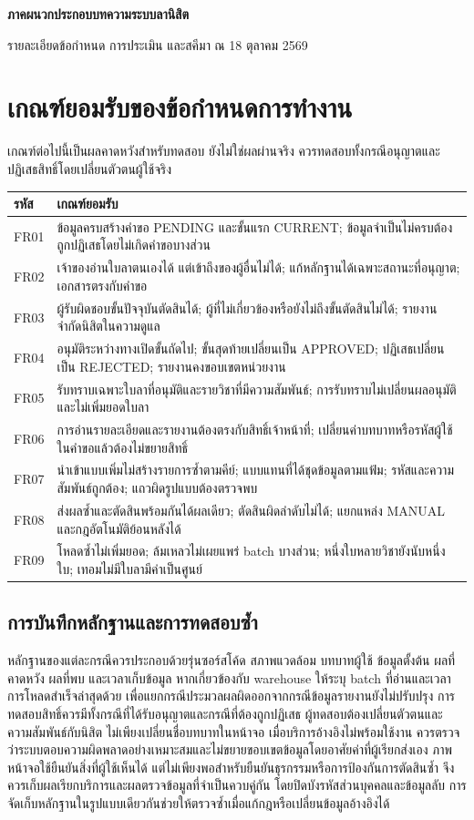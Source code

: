 \begin{center}\textbf{ภาคผนวกประกอบบทความระบบลานิสิต}\end{center}
รายละเอียดข้อกำหนด การประเมิน และสคีมา ณ 18 ตุลาคม 2569
\appendix
\section{เกณฑ์ยอมรับของข้อกำหนดการทำงาน}
เกณฑ์ต่อไปนี้เป็นผลคาดหวังสำหรับทดสอบ ยังไม่ใช่ผลผ่านจริง ควรทดสอบทั้งกรณีอนุญาตและปฏิเสธสิทธิ์โดยเปลี่ยนตัวตนผู้ใช้จริง
\begin{tabularx}{\textwidth}{|p{16mm}|X|}
\hline
รหัส & เกณฑ์ยอมรับ \\ \hline
FR01 & ข้อมูลครบสร้างคำขอ PENDING และขั้นแรก CURRENT; ข้อมูลจำเป็นไม่ครบต้องถูกปฏิเสธโดยไม่เกิดคำขอบางส่วน \\ \hline
FR02 & เจ้าของอ่านใบลาตนเองได้ แต่เข้าถึงของผู้อื่นไม่ได้; แก้หลักฐานได้เฉพาะสถานะที่อนุญาต; เอกสารตรงกับคำขอ \\ \hline
FR03 & ผู้รับผิดชอบขั้นปัจจุบันตัดสินได้; ผู้ที่ไม่เกี่ยวข้องหรือยังไม่ถึงขั้นตัดสินไม่ได้; รายงานจำกัดนิสิตในความดูแล \\ \hline
FR04 & อนุมัติระหว่างทางเปิดขั้นถัดไป; ขั้นสุดท้ายเปลี่ยนเป็น APPROVED; ปฏิเสธเปลี่ยนเป็น REJECTED; รายงานคงขอบเขตหน่วยงาน \\ \hline
FR05 & รับทราบเฉพาะใบลาที่อนุมัติและรายวิชาที่มีความสัมพันธ์; การรับทราบไม่เปลี่ยนผลอนุมัติและไม่เพิ่มยอดใบลา \\ \hline
FR06 & การอ่านรายละเอียดและรายงานต้องตรงกับสิทธิ์เจ้าหน้าที่; เปลี่ยนค่าบทบาทหรือรหัสผู้ใช้ในคำขอแล้วต้องไม่ขยายสิทธิ์ \\ \hline
FR07 & นำเข้าแบบเพิ่มไม่สร้างรายการซ้ำตามคีย์; แบบแทนที่ได้ชุดข้อมูลตามแฟ้ม; รหัสและความสัมพันธ์ถูกต้อง; แถวผิดรูปแบบต้องตรวจพบ \\ \hline
FR08 & ส่งผลซ้ำและตัดสินพร้อมกันได้ผลเดียว; ตัดสินผิดลำดับไม่ได้; แยกแหล่ง MANUAL และกฎอัตโนมัติย้อนหลังได้ \\ \hline
FR09 & โหลดซ้ำไม่เพิ่มยอด; ล้มเหลวไม่เผยแพร่ batch บางส่วน; หนึ่งใบหลายวิชายังนับหนึ่งใบ; เทอมไม่มีใบลามีค่าเป็นศูนย์ \\ \hline
\end{tabularx}
\subsection{การบันทึกหลักฐานและการทดสอบซ้ำ}
หลักฐานของแต่ละกรณีควรประกอบด้วยรุ่นซอร์สโค้ด สภาพแวดล้อม บทบาทผู้ใช้ ข้อมูลตั้งต้น ผลที่คาดหวัง ผลที่พบ และเวลาเก็บข้อมูล หากเกี่ยวข้องกับ warehouse ให้ระบุ batch ที่อ่านและเวลาการโหลดสำเร็จล่าสุดด้วย เพื่อแยกกรณีประมวลผลผิดออกจากกรณีข้อมูลรายงานยังไม่ปรับปรุง
การทดสอบสิทธิ์ควรมีทั้งกรณีที่ได้รับอนุญาตและกรณีที่ต้องถูกปฏิเสธ ผู้ทดสอบต้องเปลี่ยนตัวตนและความสัมพันธ์กับนิสิต ไม่เพียงเปลี่ยนชื่อบทบาทในหน้าจอ เมื่อบริการอ้างอิงไม่พร้อมใช้งาน ควรตรวจว่าระบบตอบความผิดพลาดอย่างเหมาะสมและไม่ขยายขอบเขตข้อมูลโดยอาศัยค่าที่ผู้เรียกส่งเอง
ภาพหน้าจอใช้ยืนยันสิ่งที่ผู้ใช้เห็นได้ แต่ไม่เพียงพอสำหรับยืนยันธุรกรรมหรือการป้องกันการตัดสินซ้ำ จึงควรเก็บผลเรียกบริการและผลตรวจข้อมูลที่จำเป็นควบคู่กัน โดยปิดบังรหัสส่วนบุคคลและข้อมูลลับ การจัดเก็บหลักฐานในรูปแบบเดียวกันช่วยให้ตรวจซ้ำเมื่อแก้กฎหรือเปลี่ยนข้อมูลอ้างอิงได้
